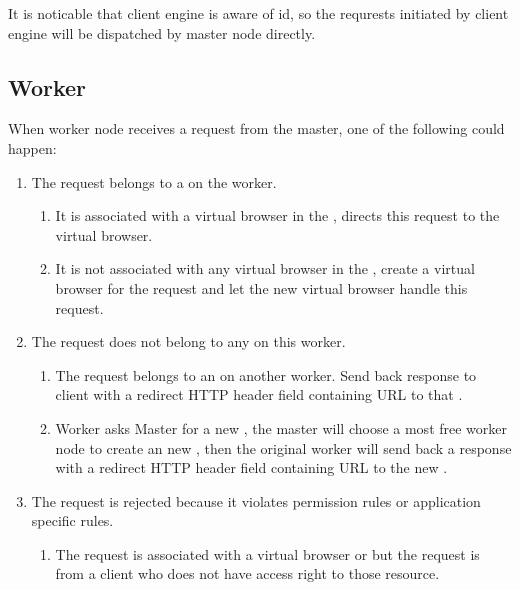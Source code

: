 It is noticable that client engine is aware of \appins{} id, so the 
requrests initiated by client engine will be dispatched by master node directly.


\requestdispatchdiagram{}


\subsection{Worker}
\label{sec:worker}
When worker node receives a request from the master, 
one of the following could happen:

\begin{enumerate}
    \item The request belongs to a \appins{} on the worker.
    \begin{enumerate}
        \item It is associated with a virtual browser in the \appins{}, directs this request to the virtual browser.
        \item It is not associated with any virtual browser in the \appins{}, create a virtual browser for the request
        and let the new virtual browser handle this request.
    \end{enumerate}

    \item The request does not belong to any \appins{} on this worker.
    \begin{enumerate}
        \item The request belongs to an \appins{} on another worker. 
        Send back response to client with a redirect HTTP header field
        containing URL to that \appins{}.
        \item Worker asks Master for a new \appins{}, 
        the master will choose a most free worker node to create an new \appins{},
        then the original worker will send back a response with a redirect HTTP header field
        containing URL to the new \appins{}.
    \end{enumerate}

    \item The request is rejected because it violates permission rules or application specific rules.
    \begin{enumerate}
        \item The request is associated with a virtual browser or \appins{} but 
        the request is from a client who does not have access right to those resource.
    \end{enumerate}    
\end{enumerate} 


